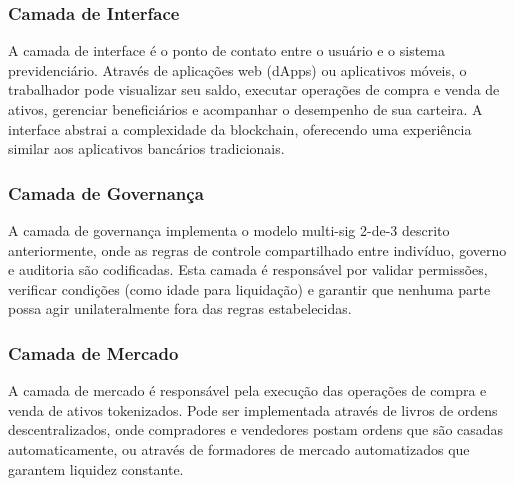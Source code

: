 \begin{figure}[htb]
\end{figure}

\subsubsection{Camada de Interface}

A camada de interface é o ponto de contato entre o usuário e o sistema previdenciário. Através de aplicações web (dApps) ou aplicativos móveis, o trabalhador pode visualizar seu saldo, executar operações de compra e venda de ativos, gerenciar beneficiários e acompanhar o desempenho de sua carteira. A interface abstrai a complexidade da blockchain, oferecendo uma experiência similar aos aplicativos bancários tradicionais.

\subsubsection{Camada de Governança}

A camada de governança implementa o modelo multi-sig 2-de-3 descrito anteriormente, onde as regras de controle compartilhado entre indivíduo, governo e auditoria são codificadas. Esta camada é responsável por validar permissões, verificar condições (como idade para liquidação) e garantir que nenhuma parte possa agir unilateralmente fora das regras estabelecidas.

\subsubsection{Camada de Mercado}

A camada de mercado é responsável pela execução das operações de compra e venda de ativos tokenizados. Pode ser implementada através de livros de ordens descentralizados, onde compradores e vendedores postam ordens que são casadas automaticamente, ou através de formadores de mercado automatizados que garantem liquidez constante.

